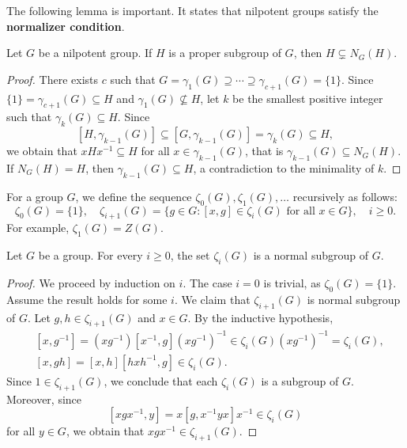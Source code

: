 The following lemma is important. It states that nilpotent groups satisfy 
the \textbf{normalizer condition}. 

\begin{lemma}
\label{lem:normalizadora}
Let $G$ be a nilpotent group. If $H$ is a proper subgroup of $G$, then 
$H\subsetneq N_G(H)$.
\end{lemma}

\begin{proof}
There exists $c$ such that $G=\gamma_1(G)\supseteq\cdots\supseteq\gamma_{c+1}(G)=\{1\}$. Since 
$\{1\}=\gamma_{c+1}(G)\subseteq H$ and $\gamma_1(G)\not\subseteq H$, 
let $k$ be the smallest positive integer such that  $\gamma_k(G)\subseteq H$. 
Since
\[
[H,\gamma_{k-1}(G)]\subseteq [G,\gamma_{k-1}(G)]=\gamma_k(G)\subseteq H,
\]
we obtain that  
$xHx^{-1}\subseteq H$ for all $x\in\gamma_{k-1}(G)$,
that is $\gamma_{k-1}(G)\subseteq N_G(H)$. If $N_G(H)=H$, then
$\gamma_{k-1}(G)\subseteq H$, a contradiction to the minimality of $k$. 
\end{proof}

For a group $G$, we define the sequence  $\zeta_0(G),\zeta_1(G),\dots$
recursively as follows: 
\[
	\zeta_0(G)=\{1\},\quad
	\zeta_{i+1}(G)=\{g\in G:[x,g]\in\zeta_{i}(G)\text{ for all $x\in G$}\},\quad i\geq 0.
\]
For example, $\zeta_1(G)=Z(G)$.

\begin{lemma}
\label{lem:central_ascendente}
Let $G$ be a group. For every $i\geq0$, the set $\zeta_i(G)$ 
is a normal subgroup of $G$. 
\end{lemma}

\begin{proof}
We proceed by induction on $i$. The case $i=0$ is trivial, as 
$\zeta_0(G)=\{1\}$. Assume the result holds for some $i$.
We claim that $\zeta_{i+1}(G)$ is normal subgroup of $G$. 
Let $g,h\in \zeta_{i+1}(G)$ and $x\in G$. By the inductive hypothesis, 
\begin{align*}
	&[x,g^{-1}]=(xg^{-1})[x^{-1},g](xg^{-1})^{-1}\in\zeta_i(G)(xg^{-1})^{-1}=\zeta_i(G),\\
	&[x,gh]=[x,h][hxh^{-1},g]\in \zeta_{i}(G).
\end{align*}
Since $1\in\zeta_{i+1}(G)$, we conclude that each $\zeta_i(G)$ is a subgroup of $G$. 
Moreover, since 
	\[
	[xgx^{-1},y]=x[g,x^{-1}yx]x^{-1}\in\zeta_{i}(G)
	\]
for all $y\in G$, we obtain that $xgx^{-1}\in\zeta_{i+1}(G)$. 
\end{proof}

